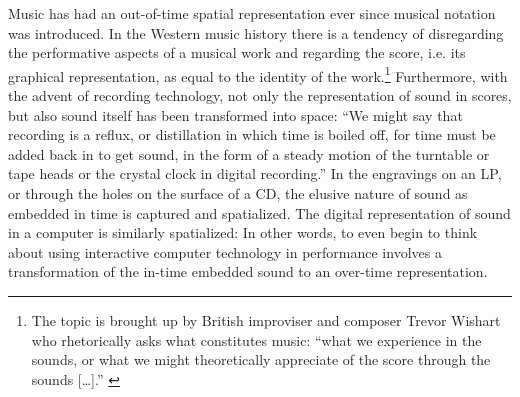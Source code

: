 \documentclass{article}
\begin{document}
Music has had an out-of-time spatial representation ever since musical notation was introduced. In the Western music history there is a tendency of disregarding the performative aspects of a musical work and regarding the score, i.e. its graphical representation, as equal to the identity of the work.\footnote{The topic is brought up by British improviser and composer Trevor Wishart who rhetorically asks what constitutes music: ``what we experience in the sounds, or what we might theoretically appreciate of the score through the sounds [\ldots].'' \cite{wis96}} Furthermore, with the advent of recording technology, not only the representation of sound in scores, but also sound itself has been transformed into space: ``We might say that recording is a reflux, or distillation in which time is boiled off, for time must be added back in to get sound, in the form of a steady motion of the turntable or tape heads or the crystal clock in digital recording.'' \citep[54]{evens05} In the engravings on an LP, or through the holes on the surface of a CD, the elusive nature of sound as embedded in time is captured and spatialized. The digital representation of sound in a computer is similarly spatialized: In other words, to even begin to think about using interactive computer technology in performance involves a transformation of the in-time embedded sound to an over-time representation.
\end{document}
